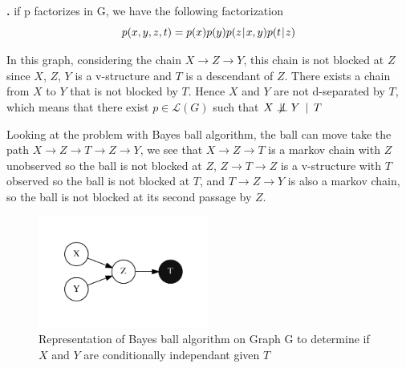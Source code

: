 \documentclass[a4paper, 11pt]{article}
\newcounter{cquestion}[subsection]
\renewcommand{\thecquestion}{\arabic{cquestion}}
\newenvironment{question}
{\par \vspace{0.5em} \noindent \stepcounter{cquestion} \hspace{-1em}
 \textbf{\thecquestion.}}
{}
\newcommand{\bigCI}{\mathrel{\text{\scalebox{1.07}{$\perp\mkern-10mu\perp$}}}}
\newcommand{\nbigCI}{\centernot{\bigCI}}
\newcommand{\nindepcond}[3]{#1 \nbigCI #2 \hspace{.5em} | \hspace{.5em} #3 }
\newcommand{\pcond}[2]{p(#1 \hspace{-.2em}\mid\hspace{-.2em} #2)}
\begin{document}
\begin{question}
  if p factorizes in G, we have the following factorization
  \begin{equation*}
    p(x, y, z, t) = p(x) p(y) \pcond{z}{x, y} \pcond{t}{z}
  \end{equation*}

  In this graph, considering the chain $X \rightarrow Z \rightarrow Y$,
  this chain is not blocked at $Z$ since $X$, $Z$, $Y$ is a v-structure
  and $T$ is a descendant of $Z$. There exists a chain from $X$ to $Y$
  that is not blocked by $T$. Hence $X$ and $Y$ are not d-separated
  by $T$, which means that there exist $p \in \mathcal{L}(G)$ such that
  $\nindepcond{X}{Y}{T}$

  Looking at the problem with Bayes ball algorithm, the ball can move
  take the path $X \rightarrow Z \rightarrow T \rightarrow Z \rightarrow Y$,
  we see that $X \rightarrow Z \rightarrow T$ is a markov chain with
  $Z$ unobserved so the ball is not blocked at $Z$,
  $Z \rightarrow T \rightarrow Z$ is a v-structure with $T$ observed
  so the ball is not blocked at $T$, and
  $T \rightarrow Z \rightarrow Y$ is also a markov chain, so the ball
  is not blocked at its second passage by $Z$.

\begin{figure}[h!]
  \centering
  \includegraphics[width=0.5\textwidth]{graph.pdf}
  \caption{Representation of Bayes ball algorithm on Graph G to
    determine if $X$ and $Y$ are conditionally independant given
    $T$}\label{fig:LDA-A-train}
\end{figure}


\end{question}
\end{document}

